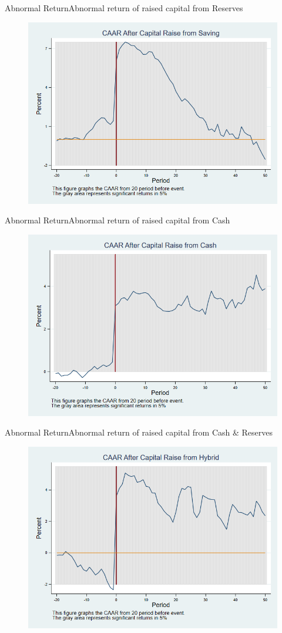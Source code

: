 \documentclass{beamer}
\begin{document}
	
	\begin{frame}{Abnormal Return}{Abnormal return of raised capital from Reserves}
		\label{car_marketmodelSaving}
		\begin{figure}
			\centering
			\includegraphics[width=0.65\linewidth]{Output/car_marketmodelSaving.png}
			\label{fig:car_marketmodelSaving}
		\end{figure}
	\end{frame}
	
	
	\begin{frame}{Abnormal Return}{Abnormal return of raised capital from Cash}
		\label{car_marketmodelCash}
		\begin{figure}
			\centering
			\includegraphics[width=0.65\linewidth]{Output/car_marketmodelCash.png}
			\label{fig:car_marketmodelCash}
		\end{figure}
		
	\end{frame}
	
	\begin{frame}{Abnormal Return}{Abnormal return of raised capital from Cash \& Reserves}
		\label{car_marketmodelHybrid}
		\begin{figure}
			\centering
			\includegraphics[width=0.65\linewidth]{Output/car_marketmodelHybrid.png}
			\label{fig:car_marketmodelHybrid}
		\end{figure}
	\end{frame}
	
\end{document}
